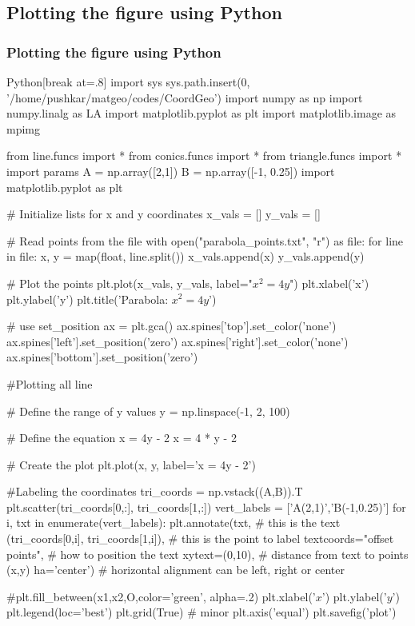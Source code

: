 \documentclass{beamer}
\theoremstyle{remark}
\numberwithin{equation}{section}
\begin{document}
  \subsection{Plotting the figure using Python}
\begin{frame}
\frametitle{Plotting the figure using Python}
   \begin{mintedbox}{Python}[break at=.8\textheight]
import sys                                  
sys.path.insert(0, '/home/pushkar/matgeo/codes/CoordGeo')    
import numpy as np
import numpy.linalg as LA
import matplotlib.pyplot as plt
import matplotlib.image as mpimg

from line.funcs import *
from conics.funcs import *
from triangle.funcs import *
import params
A = np.array([2,1])
B = np.array([-1, 0.25])
import matplotlib.pyplot as plt

# Initialize lists for x and y coordinates
x_vals = []
y_vals = []

# Read points from the file
with open("parabola_points.txt", "r") as file:
    for line in file:
        x, y = map(float, line.split())
        x_vals.append(x)
        y_vals.append(y)

# Plot the points
plt.plot(x_vals, y_vals, label="$x^2 = 4y$")
plt.xlabel('x')
plt.ylabel('y')
plt.title('Parabola: $x^2 = 4y$')

# use set_position
ax = plt.gca()
ax.spines['top'].set_color('none')
ax.spines['left'].set_position('zero')
ax.spines['right'].set_color('none')
ax.spines['bottom'].set_position('zero')

#Plotting all line

# Define the range of y values
y = np.linspace(-1, 2, 100)

# Define the equation x = 4y - 2
x = 4 * y - 2

# Create the plot
plt.plot(x, y, label='x = 4y - 2')



#Labeling the coordinates
tri_coords = np.vstack((A,B)).T
plt.scatter(tri_coords[0,:], tri_coords[1,:])
vert_labels = ['A(2,1)','B(-1,0.25)']
for i, txt in enumerate(vert_labels):
       plt.annotate(txt,      # this is the text
                 (tri_coords[0,i], tri_coords[1,i]), # this is the point to label
                 textcoords="offset points",   # how to position the text
                 xytext=(0,10),     # distance from text to points (x,y)
                 ha='center')     # horizontal alignment can be left, right or center


#plt.fill_between(x1,x2,O,color='green', alpha=.2)
plt.xlabel('$x$')
plt.ylabel('$y$')
plt.legend(loc='best')
plt.grid(True) # minor
plt.axis('equal')
plt.savefig('plot')

  \end{mintedbox}
\end{frame}
\end{document}
